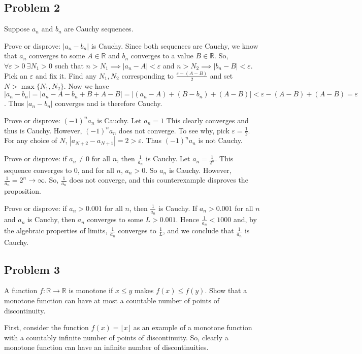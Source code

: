 \documentclass[11pt]{article}
\newcommand{\R}{\mathbb{R}}
\begin{document}
\subsection*{Problem 2}

Suppose $a_n$ and $b_n$ are Cauchy sequences.

Prove or disprove: $|a_n-b_n|$ is Cauchy.
Since both sequences are Cauchy, we know that $a_n$ converges to
some $A\in\R$ and $b_n$ converges to a value $B\in\R$.
So, $\forall\varepsilon>0\ \exists N_1>0$ such that
$n>N_1\implies |a_n-A|<\varepsilon$ and $n>N_2\implies|b_n-B|<\varepsilon$.
Pick an $\varepsilon$ and fix it. Find any $N_1,N_2$ corresponding to
$\frac{\varepsilon-(A-B)}{2}$ and set $N>\max \{N_1,N_2\}$. Now we have
$|a_n-b_n|=|a_n-A-b_n+B+A-B|=|(a_n-A)+(B-b_n)+(A-B)|<\varepsilon-(A-B)+(A-B)
=\varepsilon$. Thus $|a_n-b_n|$ converges and is therefore Cauchy.

Prove or disprove: $(-1)^na_n$ is Cauchy.
Let $a_n=1$ This clearly converges and thus is Cauchy. 
However, $(-1)^na_n$ does not converge. To see why, pick
$\varepsilon=\frac{1}{2}$. For any choice of $N$,
$|a_{N+2}-a_{N+1}|=2>\varepsilon$. Thus $(-1)^na_n$ is not Cauchy.

Prove or disprove: if $a_n\neq0$ for all $n$, then $\frac{1}{a_n}$ is Cauchy.
Let $a_n=\frac{1}{2^n}$. This sequence converges to 0, and for all
$n$, $a_n>0$. So $a_n$ is Cauchy. However, $\frac{1}{a_n}=2^n\to\infty$.
So, $\frac{1}{a_n}$ does not converge, and this counterexample disproves
the proposition.

Prove or disprove: if $a_n>0.001$ for all $n$, then $\frac{1}{a_n}$ is Cauchy.
If $a_n>0.001$ for all $n$ and $a_n$ is Cauchy, then $a_n$ converges
to some $L>0.001$. Hence $\frac{1}{a_n}<1000$ and, by the algebraic properties
of limits, $\frac{1}{a_n}$ converges to $\frac{1}{L}$, and we conclude that
$\frac{1}{a_n}$ is Cauchy.

\subsection*{Problem 3}

A function $f:\R\to\R$ is monotone if $x\leq y$ makes $f(x)\leq f(y)$.
Show that a monotone function can have at most a countable number of
points of discontinuity.

First, consider the function $f(x)=\lfloor x\rfloor$ as an example of
a monotone function with a countably infinite number of points of
discontinuity. So, clearly a monotone function can have an infinite number of
discontinuities.
\end{document}
